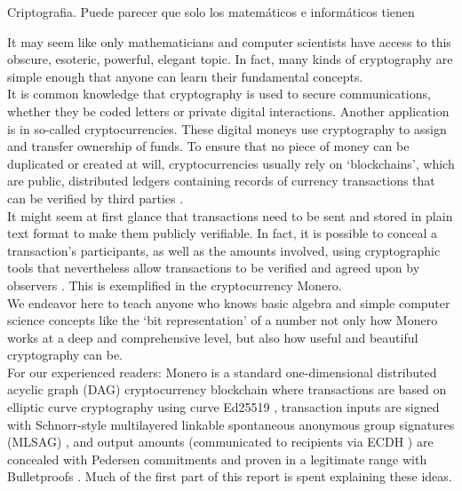 

Criptografia. Puede parecer que solo los matemáticos e informáticos tienen

It may seem like only mathematicians and computer scientists have access to this obscure, esoteric, powerful, elegant topic. In fact, many kinds of cryptography are simple enough that anyone can learn their fundamental concepts.
\\ \newline
It is common knowledge that cryptography is used to secure communications, whether they be coded letters or private digital interactions. Another application is in so-called cryptocurrencies. These digital moneys use cryptography to assign and transfer ownership of funds. To ensure that no piece of money can be duplicated or created at will, cryptocurrencies usually rely on `blockchains', which are public, distributed ledgers containing records of currency transactions that can be verified by third parties \cite{Nakamoto_bitcoin}.
\\ \newline
It might seem at first glance that transactions need to be sent and stored in plain text format to make them publicly verifiable. In fact, it is possible to conceal a transaction's participants, as well as the amounts involved, using cryptographic tools that nevertheless allow transactions to be verified and agreed upon by observers \cite{cryptoNoteWhitePaper}. This is exemplified in the cryptocurrency Monero.
\\ \newline
We endeavor here to teach anyone who knows basic algebra and simple computer science concepts like the `bit representation' of a number not only how Monero works at a deep and comprehensive level, but also how useful and beautiful cryptography can be.
\\ \newline
For our experienced readers: Monero is a standard one-dimensional distributed acyclic graph (DAG) cryptocurrency blockchain \cite{Nakamoto_bitcoin} where transactions are based on elliptic curve cryptography using curve Ed25519 \cite{Bernstein2008}, transaction inputs are signed with Schnorr-style multilayered linkable spontaneous anonymous group signatures (MLSAG) \cite{MRL-0005-ringct}, and output amounts (communicated to recipients via ECDH \cite{Diffie-Hellman}) are concealed with Pedersen commitments \cite{maxwell-ct} and proven in a legitimate range with Bulletproofs \cite{Bulletproofs_paper}. Much of the first part of this report is spent explaining these ideas.
